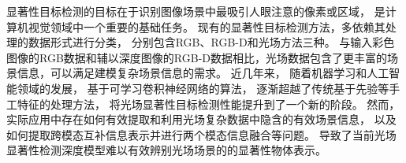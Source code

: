%
%
%
%
显著性目标检测的目标在于识别图像场景中最吸引人眼注意的像素或区域，
是计算机视觉领域中一个重要的基础任务。
现有的显著性目标检测方法，多依赖其处理的数据形式进行分类，
分别包含RGB、RGB-D和光场方法三种。
与输入彩色图像的RGB数据和辅以深度图像的RGB-D数据相比，光场数据包含了更丰富的场景信息，可以满足建模复杂场景信息的需求。
近几年来，
随着机器学习和人工智能领域的发展，
基于可学习卷积神经网络的算法，
逐渐超越了传统基于先验等手工特征的处理方法，
将光场显著性目标检测性能提升到了一个新的阶段。
%
%
%
%
%
%
然而，实际应用中存在如何有效提取和利用光场复杂数据中隐含的有效场景信息，
以及如何提取跨模态互补信息表示并进行两个模态信息融合等问题。
导致了当前光场显著性检测深度模型难以有效辨别光场场景的的显著性物体表示。
